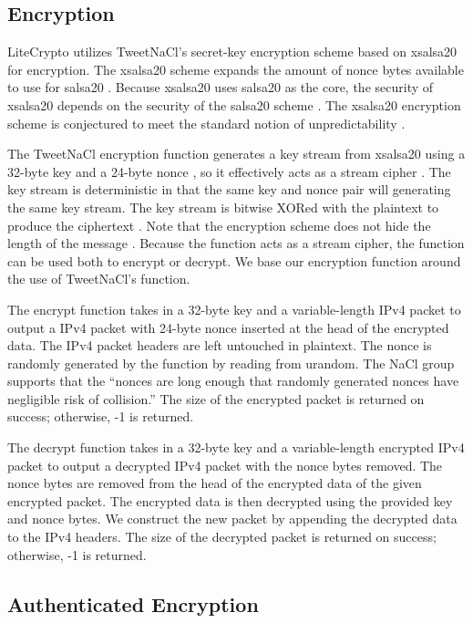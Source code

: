 \documentclass[12pt]{article}
\begin{document}
\begin{multicols}{2}
\subsection{Encryption}

LiteCrypto utilizes TweetNaCl's secret-key encryption scheme based on xsalsa20 for encryption. The xsalsa20 scheme expands the amount of nonce bytes available to use for salsa20 \cite{TweetNaClPaper}. Because xsalsa20 uses salsa20 as the core, the security of xsalsa20 depends on the security of the salsa20 scheme \cite{TweetNaClPaper}. The xsalsa20 encryption scheme is conjectured to meet the standard notion of unpredictability \cite{NaClSiteStream}.

The TweetNaCl encryption function generates a key stream from xsalsa20 using a 32-byte key and a 24-byte nonce \cite{NaClSiteStream}, so it effectively acts as a stream cipher \cite{TweetNaClPaper}. The key stream is deterministic in that the same key and nonce pair will generating the same key stream. The key stream is bitwise XORed with the plaintext to produce the ciphertext \cite{TweetNaClPaper}. Note that the encryption scheme does not hide the length of the message \cite{NaClSiteStream}. Because the function acts as a stream cipher, the function can be used both to encrypt or decrypt. We base our encryption function around the use of TweetNaCl's function.

The encrypt function takes in a 32-byte key \cite{TweetNaClPaper} and a variable-length IPv4 packet to output a IPv4 packet with 24-byte nonce inserted at the head of the encrypted data. The IPv4 packet headers are left untouched in plaintext. The nonce is randomly generated by the function by reading from urandom. The NaCl group supports that the “nonces are long enough that randomly generated nonces have negligible risk of collision.” \cite{NaClSiteStream} The size of the encrypted packet is returned on success; otherwise, -1 is returned.

The decrypt function takes in a 32-byte key \cite{TweetNaClPaper} and a variable-length encrypted IPv4 packet to output a decrypted IPv4 packet with the nonce bytes removed. The nonce bytes are removed from the head of the encrypted data of the given encrypted packet. The encrypted data is then decrypted using the provided key and nonce bytes. We construct the new packet by appending the decrypted data to the IPv4 headers. The size of the decrypted packet is returned on success; otherwise, -1 is returned.

\subsection{Authenticated Encryption}


\end{multicols}
\end{document}

